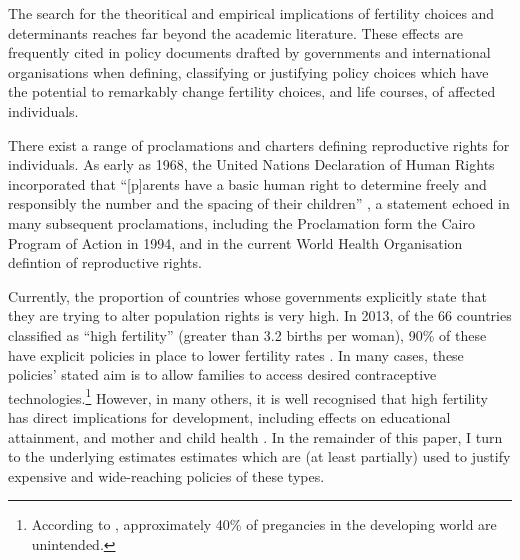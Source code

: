 The search for the theoritical and empirical implications of fertility choices
and determinants reaches far beyond the academic literature. These effects are
frequently cited in policy documents drafted by governments and international 
organisations when defining, classifying or justifying policy choices which have
the potential to remarkably change fertility choices, and life courses, of 
affected individuals.

There exist a range of proclamations and charters defining reproductive rights
for individuals.  As early as 1968, the United Nations Declaration of Human 
Rights incorporated that ``[p]arents have a basic human right to determine 
freely and responsibly the number and the spacing of their children'' 
\citep{UN1968}, a statement echoed in many subsequent proclamations, 
including the Proclamation form the Cairo Program of Action in 1994, and in the 
current World Health Organisation defintion of reproductive rights. 

Currently, the proportion of countries whose governments explicitly state that
they are trying to alter population rights is very high.  In 2013, of the 66 
countries classified as ``high fertility'' (greater than 3.2 births per woman), 
90\% of these have explicit policies in place to lower fertility rates 
\citep{UN2013}.  In many cases, these policies' stated aim is to allow families
to access desired contraceptive technologies.\footnote{According to 
\citet{BongaartsSinding2011}, approximately 40\% of pregancies in the developing
world are unintended.}  However, in many others, it is well recognised that
high fertility has direct implications for development, including effects on 
educational attainment, and mother and child health \citep{UN2013}.  In the
remainder of this paper, I turn to the underlying estimates estimates which are
(at least partially) used to justify expensive and wide-reaching policies of 
these types.

